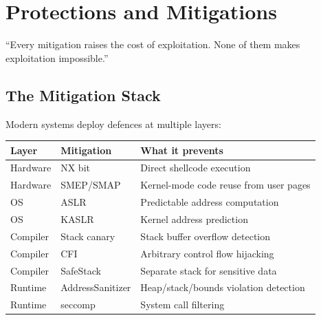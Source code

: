 \chapter{Protections and Mitigations}
\label{ch:protections}

\epigraph{``Every mitigation raises the cost of exploitation. None of them makes exploitation impossible.''}{}


\section{The Mitigation Stack}

Modern systems deploy defences at multiple layers:

\begin{longtable}{p{3cm}p{4cm}p{5cm}}
	\toprule
	\textbf{Layer} & \textbf{Mitigation} & \textbf{What it prevents}              \\
	\midrule
	Hardware       & NX bit              & Direct shellcode execution             \\
	Hardware       & SMEP/SMAP           & Kernel-mode code reuse from user pages \\
	OS             & ASLR                & Predictable address computation        \\
	OS             & KASLR               & Kernel address prediction              \\
	Compiler       & Stack canary        & Stack buffer overflow detection        \\
	Compiler       & CFI                 & Arbitrary control flow hijacking       \\
	Compiler       & SafeStack           & Separate stack for sensitive data      \\
	Runtime        & AddressSanitizer    & Heap/stack/bounds violation detection  \\
	Runtime        & seccomp             & System call filtering                  \\
	\bottomrule
\end{longtable}

